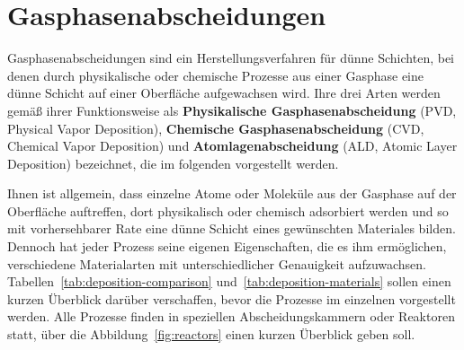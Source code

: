 \section{Gasphasenabscheidungen}
\label{depositions}

Gasphasenabscheidungen sind ein Herstellungsverfahren für dünne Schichten, bei denen durch physikalische oder chemische Prozesse aus einer Gasphase eine dünne Schicht auf einer Oberfläche aufgewachsen wird.
Ihre drei Arten werden gemäß ihrer Funktionsweise als \textbf{Physikalische Gasphasenabscheidung} (PVD, Physical Vapor Deposition), \textbf{Chemische Gasphasenabscheidung} (CVD, Chemical Vapor Deposition) und \textbf{Atomlagenabscheidung} (ALD, Atomic Layer Deposition) bezeichnet, die im folgenden vorgestellt werden.

Ihnen ist allgemein, dass einzelne Atome oder Moleküle aus der Gasphase auf der Oberfläche auftreffen, dort physikalisch oder chemisch adsorbiert werden und so mit vorhersehbarer Rate eine dünne Schicht eines gewünschten Materiales bilden.
Dennoch hat jeder Prozess seine eigenen Eigenschaften, die es ihm ermöglichen, verschiedene Materialarten mit unterschiedlicher Genauigkeit aufzuwachsen.
Tabellen~\ref{tab:deposition-comparison} und~\ref{tab:deposition-materials} sollen einen kurzen Überblick darüber verschaffen, bevor die Prozesse im einzelnen vorgestellt werden.
Alle Prozesse finden in speziellen Abscheidungskammern oder Reaktoren statt, über die Abbildung~\ref{fig:reactors} einen kurzen Überblick geben soll.

